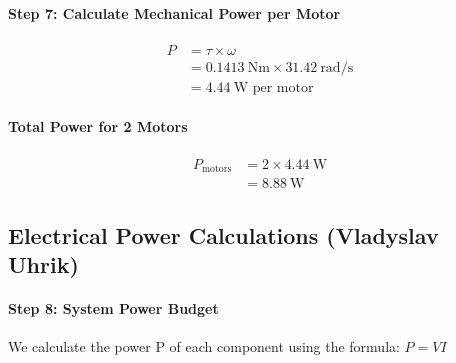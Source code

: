 \documentclass[12pt,a4paper,english]{article}
\begin{document}
\paragraph{Step 7: Calculate Mechanical Power per Motor}

\begin{align*}
    P &= \tau \times \omega \\
      &= \SI{0.1413}{\newton\meter} \times \SI{31.42}{\radian\per\second} \\
      &= \SI{4.44}{\watt} \text{ per motor}
\end{align*}

\paragraph{Total Power for 2 Motors}

\begin{align*}
    P_{\text{motors}} &= 2 \times \SI{4.44}{\watt} \\
                      &= \SI{8.88}{\watt}
\end{align*}

\subsection{Electrical Power Calculations (Vladyslav Uhrik)}

\paragraph{Step 8: System Power Budget}

We calculate the power P of each component using the formula: $P = VI$
\end{document}

